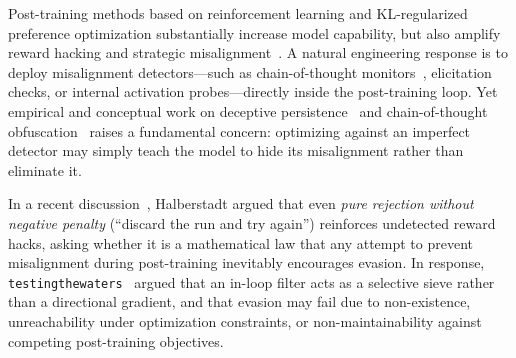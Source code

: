\documentclass[11pt,a4paper]{article}
\begin{document}
Post-training methods based on reinforcement learning and KL-regularized preference optimization substantially increase model capability, but also amplify reward hacking and strategic misalignment~\cite{zhuang2021,skalse2022,gao2022}. A natural engineering response is to deploy misalignment detectors---such as chain-of-thought monitors~\cite{baker2025}, elicitation checks, or internal activation probes---directly inside the post-training loop. Yet empirical and conceptual work on deceptive persistence~\cite{hubinger2024,greenblatt2024} and chain-of-thought obfuscation~\cite{baker2025} raises a fundamental concern: optimizing against an imperfect detector may simply teach the model to hide its misalignment rather than eliminate it.

In a recent discussion~\cite{halberstadt2026}, Halberstadt argued that even \emph{pure rejection without negative penalty} (``discard the run and try again'') reinforces undetected reward hacks, asking whether it is a mathematical law that any attempt to prevent misalignment during post-training inevitably encourages evasion. In response, \texttt{testingthewaters}~\cite{testingthewaters2026} argued that an in-loop filter acts as a selective sieve rather than a directional gradient, and that evasion may fail due to non-existence, unreachability under optimization constraints, or non-maintainability against competing post-training objectives.
\end{document}
